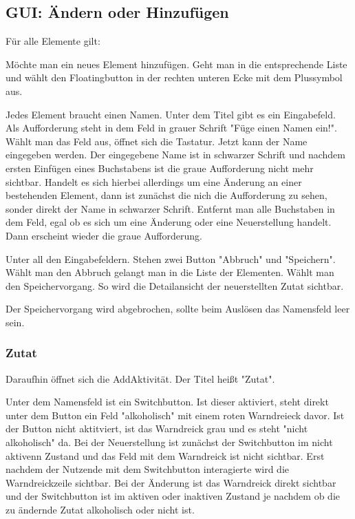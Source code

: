 \subsection{GUI: Ändern oder Hinzufügen}

Für alle Elemente gilt:

Möchte man ein neues Element hinzufügen. Geht man in die entsprechende Liste und wählt den Floatingbutton in der rechten unteren Ecke mit dem Plussymbol aus.

Jedes Element braucht einen Namen. Unter dem Titel gibt es ein Eingabefeld. Als Aufforderung steht in dem Feld in grauer Schrift "Füge einen Namen ein!". Wählt man das Feld aus, öffnet sich die Tastatur. Jetzt kann der Name eingegeben werden. Der eingegebene Name ist in schwarzer Schrift und nachdem ersten Einfügen eines Buchstabens ist die graue Aufforderung nicht mehr sichtbar. Handelt es sich hierbei allerdings um eine Änderung an einer bestehenden Element, dann ist zunächst die nich die Aufforderung zu sehen, sonder direkt der Name in schwarzer Schrift. Entfernt man alle Buchstaben in dem Feld, egal ob es sich um eine Änderung oder eine Neuerstellung handelt. Dann erscheint wieder die graue Aufforderung.

Unter all den Eingabefeldern. Stehen zwei Button "Abbruch" und "Speichern". Wählt man den Abbruch gelangt man in die Liste der Elementen. Wählt man den Speichervorgang. So wird die Detailansicht der neuerstellten Zutat sichtbar.

Der Speichervorgang wird abgebrochen, sollte beim Auslösen das Namensfeld leer sein.

\subsubsection{Zutat}

Daraufhin öffnet sich die AddAktivität. Der Titel heißt "Zutat".

Unter dem Namensfeld ist ein Switchbutton. Ist dieser aktiviert, steht direkt unter dem Button ein Feld "alkoholisch" mit einem roten Warndreieck davor. Ist der Button nicht aktitviert, ist das Warndreick grau und es steht "nicht alkoholisch" da. Bei der Neuerstellung ist zunächst der Switchbutton im nicht aktivenn Zustand und das Feld mit dem Warndreick ist nicht sichtbar. Erst nachdem der Nutzende mit dem Switchbutton interagierte wird die Warndreickzeile sichtbar. Bei der Änderung ist das Warndreick direkt sichtbar und der Switchbutton ist im aktiven oder inaktiven Zustand je nachdem ob die zu ändernde Zutat alkoholisch oder nicht ist.

